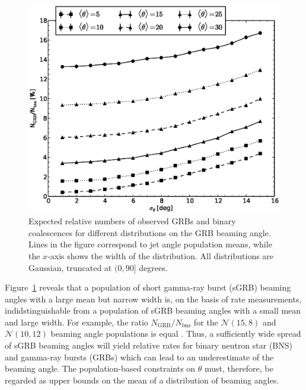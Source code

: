 \documentclass[twocolumn,nofootinbib]{revtex4-1}
\def\bns#1{binary neutron star#1 (BNS#1)\gdef\bns{BNS}}
\def\grb#1{gamma-ray burst#1 (GRB#1)\gdef\grb{GRB}}
\def\sgrb#1{short gamma-ray burst#1 (sGRB#1)\gdef\sgrb{sGRB}}
\newcommand{\red}[1]{{\color{red}{#1}}}
\begin{document}
\begin{figure}
\centering
\includegraphics[width=\linewidth]{theta_dist_grbfrac.eps}
\caption{\label{fig:thetapopulation} Expected relative
numbers of observed GRBs and binary coalescences for different distributions
on the GRB beaming angle.  Lines in the figure correspond to jet angle
population means, while the $x$-axis shows the width of the distribution.  All 
distributions are Gaussian, truncated at $(0, 90]$ degrees.\label{fig:thetapop}}
\end{figure}

Figure~\ref{fig:thetapop} reveals that a population of \sgrb{} beaming angles
with a large mean but narrow width is, on the basis of rate measurements,
indidstinguishable from a population of \sgrb{} beaming angles with a small mean
and large width.  For example, the ratio $N_{\mathrm{GRB}}/N_{\mathrm{bns}}$ for
the ${\mathcal N}(15,8)$ and ${\mathcal N}(10,12)$ beaming angle populations is
equal \red{add a line to the figure}.  Thus, a sufficiently wide spread of
\sgrb{} beaming angles will yield relative rates for \bns{} and \grb{s} which
can lead to an underestimate of the beaming angle.  The population-based
constraints on $\theta$ must, therefore, be regarded as upper bounds on the mean
of a distribution of beaming angles. \red{not sure if i've got this the right
way round}

\red{Also need to mention that the variation in the ratio with distribution
    width is quite small; for a given mean value $\langle \theta \rangle$, the
ratio is rather insensitive to the width}
\end{document}
